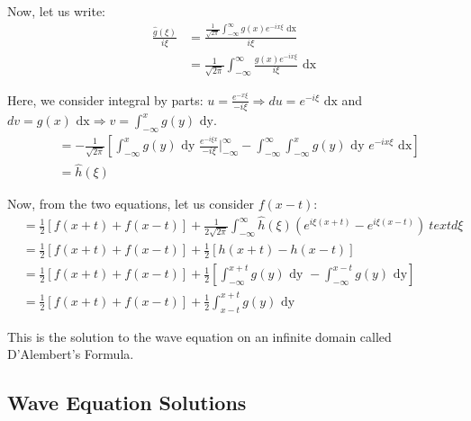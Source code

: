 \begin{enumerate}
  Now, let us write:
  \begin{align}
    \frac{\hat g(\xi)}{i \xi}
    & = \frac{\frac{1}{\sqrt{2\pi}} \int^\infty_{-\infty} g(x)e^{-i x \xi} \text{ dx}}{i \xi}\\
    & = \frac{1}{\sqrt{2 \pi}} \int^\infty_{-\infty} \frac{g(x)e^{-i x \xi} }{i \xi} \text{ dx}
  \end{align}

  Here, we consider integral by parts: $u = \frac{e^{- x \xi}}{- i \xi} \Rightarrow du = e^{- i \xi} \text{ dx}$ and $dv = g(x) \text{ dx} \Rightarrow v = \int^x_{-\infty} g(y) \text{ dy}$.
  \begin{align}
    & = - \frac{1}{\sqrt{2 \pi}}
    \left[
    \int^x_{-\infty} g(y) \text{ dy } \frac{e^{-i \xi x}}{- i \xi} \Big|^\infty_{-\infty} - \int^\infty_{-\infty} \int^x_{-\infty} g(y) \text{ dy } e^{-i x \xi} \text{ dx}
    \right]\\
    & = \hat h(\xi)
  \end{align}

  Now, from the two equations, let us consider $f(x - t)$:
  \begin{align}
    & = \frac{1}{2} \left[ f(x + t) + f(x - t) \right] + \frac{1}{2 \sqrt{2 \pi}} \int^\infty_{-\infty} \hat h(\xi) \left( e^{i \xi(x + t)} - e^{i \xi(x - t)} \right)\ text{ d}\xi\\
    & = \frac{1}{2} \left[ f(x + t) + f(x - t) \right] + \frac{1}{2} \left[ h(x + t) - h(x - t)\right]\\
    & = \frac{1}{2} \left[ f(x + t) + f(x - t) \right]
    + \frac{1}{2} \left[ \int^{x + t}_{- \infty} g(y) \text{ dy } - \int^{x - t}_{-\infty} g(y) \text{ dy} \right]\\
    & = \frac{1}{2} \left[ f(x + t) + f(x - t) \right]
    + \frac{1}{2} \int^{x + t}_{x - t} g(y) \text{ dy}
  \end{align}

  This is the solution to the wave equation on an infinite domain called D'Alembert's Formula.
\end{enumerate}

\subsection{Wave Equation Solutions}

